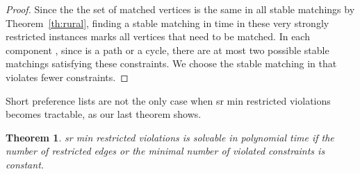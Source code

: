 \documentclass[preprint,12pt]{elsarticle}
\newtheorem{theorem}{Theorem}[section]
\begin{document}
\begin{proof}
    Since the the set of matched vertices is the same in all stable matchings by Theorem~\ref{th:rural}, finding a stable matching in  time in these very strongly restricted instances marks all vertices that need to be matched. In each component , since  is a path or a cycle, there are at most two possible stable matchings satisfying these constraints. We choose the stable matching in  that violates fewer constraints.\end{proof}

Short preference lists are not the only case when {\sc sr min restricted violations} becomes tractable, as our last theorem shows.
    
\begin{theorem}
\label{srminrestconst}
	{\sc sr min restricted violations} is solvable in polynomial time if the number of restricted edges or the minimal number of violated constraints is constant.
\end{theorem}
\end{document}
